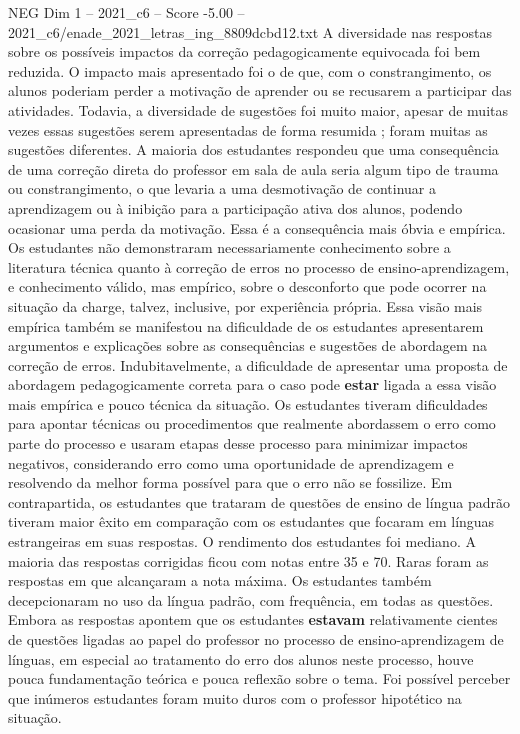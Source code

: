\begin{textsample}{NEG Dim 1 – 2021\_c6 – Score -5.00 – 2021\_c6/enade\_2021\_letras\_ing\_8809dcbd12.txt}
A diversidade nas respostas sobre os possíveis impactos da correção pedagogicamente equivocada foi bem reduzida.
O impacto mais apresentado foi o de que, com o constrangimento, os alunos poderiam perder a motivação de aprender ou se recusarem a participar das atividades.
Todavia, a diversidade de sugestões foi muito maior, apesar de muitas vezes essas sugestões serem apresentadas de forma resumida ; foram muitas as sugestões diferentes.
A maioria dos estudantes respondeu que uma consequência de uma correção direta do professor em sala de aula seria algum tipo de trauma ou constrangimento, o que levaria a uma desmotivação de continuar a aprendizagem ou à inibição para a participação ativa dos alunos, podendo ocasionar uma perda da motivação.
Essa é a consequência mais óbvia e empírica.
Os estudantes não demonstraram necessariamente conhecimento sobre a literatura técnica quanto à correção de erros no processo de ensino-aprendizagem, e conhecimento válido, mas empírico, sobre o desconforto que pode ocorrer na situação da charge, talvez, inclusive, por experiência própria.
Essa visão mais empírica também se manifestou na dificuldade de os estudantes apresentarem argumentos e explicações sobre as consequências e sugestões de abordagem na correção de erros.
Indubitavelmente, a dificuldade de apresentar uma proposta de abordagem pedagogicamente correta para o caso pode \textbf{estar} ligada a essa visão mais empírica e pouco técnica da situação.
Os estudantes tiveram dificuldades para apontar técnicas ou procedimentos que realmente abordassem o erro como parte do processo e usaram etapas desse processo para minimizar impactos negativos, considerando erro como uma oportunidade de aprendizagem e resolvendo da melhor forma possível para que o erro não se fossilize.
Em contrapartida, os estudantes que trataram de questões de ensino de língua padrão tiveram maior êxito em comparação com os estudantes que focaram em línguas estrangeiras em suas respostas.
O rendimento dos estudantes foi mediano.
A maioria das respostas corrigidas ficou com notas entre 35 e 70.
Raras foram as respostas em que alcançaram a nota máxima.
Os estudantes também decepcionaram no uso da língua padrão, com frequência, em todas as questões.
Embora as respostas apontem que os estudantes \textbf{estavam} relativamente cientes de questões ligadas ao papel do professor no processo de ensino-aprendizagem de línguas, em especial ao tratamento do erro dos alunos neste processo, houve pouca fundamentação teórica e pouca reflexão sobre o tema.
Foi possível perceber que inúmeros estudantes foram muito duros com o professor hipotético na situação.

\end{textsample}
